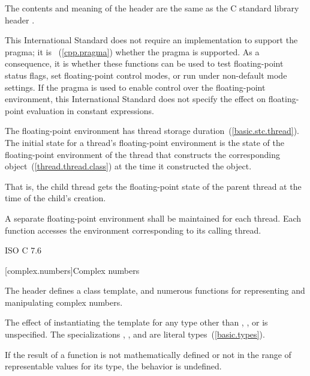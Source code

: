 \pnum
The contents and meaning of the header 
are the same as the C standard library header .
\begin{note}
This International Standard does not require an implementation to support the
 pragma;
it is ~(\ref{cpp.pragma})
whether the pragma is supported. As a consequence,
it is 
whether these functions can be used to test floating-point status flags,
set floating-point control modes, or run under non-default mode settings.
If the pragma is used to enable control over the floating-point environment,
this International Standard does not specify the effect on
floating-point evaluation in constant expressions.
\end{note}

\pnum
The floating-point environment has thread storage
duration~(\ref{basic.stc.thread}). The initial state for a thread's floating-point
environment is the state of the floating-point environment of the thread that constructs
the corresponding  object~(\ref{thread.thread.class}) at the time it
constructed the object. \begin{note} That is, the child thread gets the floating-point
state of the parent thread at the time of the child's creation. \end{note}

\pnum
A separate floating-point environment shall be maintained for each thread. Each function
accesses the environment corresponding to its calling thread.

\xref ISO C 7.6

[complex.numbers]{Complex numbers}

\pnum
The header
%
%
defines a
class template,
and numerous functions for representing and manipulating complex numbers.

\pnum
The effect of instantiating the template
for any type other than , , or  is unspecified.
The specializations
,
, and
 are literal types~(\ref{basic.types}).

\pnum
If the result of a function is not mathematically defined or not in
the range of representable values for its type, the behavior is
undefined.

